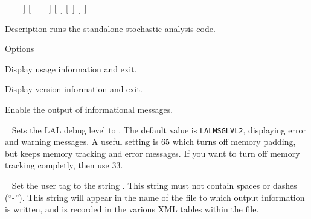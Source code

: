 \begin{entry}
~ \newline \hspace*{0.5in}
~ \newline \hspace*{0.5in}
~] \newline \hspace*{0.5in}
[~ \newline \hspace*{0.5in}
~ \newline \hspace*{0.5in}
~] \newline \hspace*{0.5in}
[~] \newline \hspace*{0.5in}
[~] \newline \hspace*{0.5in}
[~]

\item[Description]  runs the standalone
stochastic analysis code.

\item[Options]\leavevmode
\begin{entry}
\item[\option{--help}]
Display usage information and exit.

\item[\option{--version}]
Display version information and exit.

\item[\option{--verbose}]
Enable the output of informational messages.

\item[\option{--debug-level}~\parm{N}]
Sets the LAL debug level to . The default value is
\texttt{LALMSGLVL2}, displaying error and warning messages. A useful
setting is 65 which turns off memory padding, but keeps memory tracking
and error messages. If you want to turn off memory tracking completly,
then use 33.

\item[\option{--user-tag}~\parm{STRING}]
Set the user tag to the string . This string must not
contain spaces or dashes (``-''). This string will appear in the name of
the file to which output information is written, and is recorded in the
various XML tables within the file.


\end{entry}
\end{entry}
